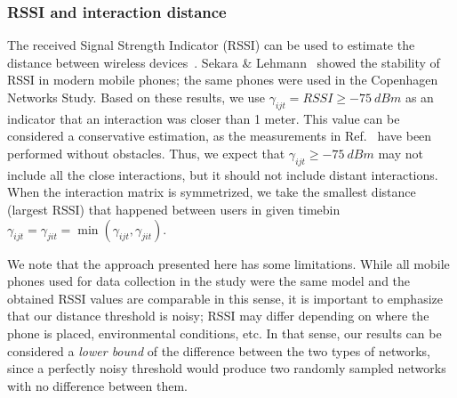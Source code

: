 \documentclass[fleqn,10pt]{wlscirep}
\begin{document}
\subsubsection*{RSSI and interaction distance}
The received Signal Strength Indicator (RSSI) can be used to estimate the distance between wireless devices~\cite{aamodt2006cc2431}.
Sekara \& Lehmann~\cite{sekara2014strength} showed the stability of RSSI in modern mobile phones; the same phones were used in the Copenhagen Networks Study.
Based on these results, we use $\gamma_{ijt} = RSSI \geq -75\ dBm$ as an indicator that an interaction was closer than 1 meter.
This value can be considered a conservative estimation, as the measurements in Ref.~\cite{sekara2014strength} have been performed without obstacles.
Thus, we expect that $\gamma_{ijt} \geq -75\ dBm$ may not include all the close interactions, but it should not include distant interactions.  
When the interaction matrix is symmetrized, we take the smallest distance (largest RSSI) that happened between users in given timebin $\gamma_{ijt} = \gamma_{jit} = \min(\gamma_{ijt}, \gamma_{jit})$.

We note that the approach presented here has some limitations.
While all mobile phones used for data collection in the study were the same model and the obtained RSSI values are comparable in this sense, it is important to emphasize that our distance threshold is noisy; RSSI may differ depending on where the phone is placed, environmental conditions, etc.
In that sense, our results can be considered a \emph{lower bound} of the difference between the two types of networks, since a perfectly noisy threshold would produce two randomly sampled networks with no difference between them.
\end{document}
